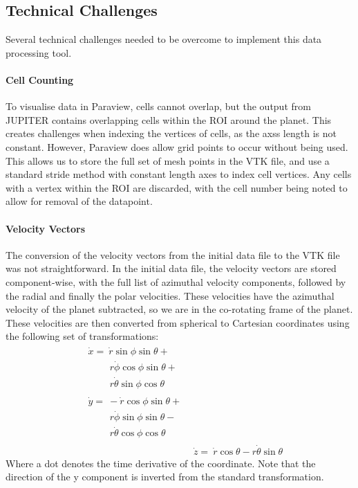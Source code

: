 \documentclass[preprint2]{aastex62}
\begin{document}
\subsection{Technical Challenges}
Several technical challenges needed to be overcome to implement this data processing tool.
\paragraph{Cell Counting}
To visualise data in Paraview, cells cannot overlap, but the output from JUPITER contains overlapping cells within the ROI around the planet. 
This creates challenges when indexing the vertices of cells, as the axss length is not constant.
However, Paraview does allow grid points to occur without being used. 
This allows us to store the full set of mesh points in the VTK file, and use a standard stride method with constant length axes to index cell vertices.
Any cells with a vertex within the ROI are discarded, with the cell number being noted to allow for removal of the datapoint.

\paragraph{Velocity Vectors}
The conversion of the velocity vectors from the initial data file to the VTK file was not straightforward. 
In the initial data file, the velocity vectors are stored component-wise, with the full list of azimuthal velocity components, followed by the radial and finally the polar velocities.
These velocities have the azimuthal velocity of the planet subtracted, so we are in the co-rotating frame of the planet.
These velocities are then converted from spherical to Cartesian coordinates using the following set of transformations:
\begin{align}
\begin{split}
&\dot{x} =\ \dot{r}\sin{\phi}\sin{\theta} +\\&\qquad\: r\dot{\phi}\cos{\phi}\sin{\theta} +\\&\qquad\: r\dot{\theta}\sin{\phi}\cos{\theta}
\end{split}\\
\begin{split}
&\dot{y} =\ -\dot{r}\cos{\phi}\sin{\theta} +\\&\qquad\: r\dot{\phi}\sin{\phi}\sin{\theta} -\\&\qquad\: r\dot{\theta}\cos{\phi}\cos{\theta}
\end{split}\\
&\dot{z} =\ \dot{r}\cos{\theta} - r\dot{\theta}\sin{\theta}
\end{align}
Where a dot denotes the time derivative of the coordinate.
Note that the direction of the y component is inverted from the standard transformation.
\end{document}
